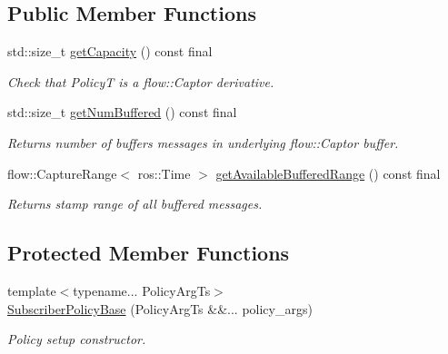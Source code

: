 \subsection*{Public Member Functions}
\begin{DoxyCompactItemize}
\item 
std\+::size\+\_\+t \hyperlink{classflow__ros_1_1_subscriber_policy_base_ad386c7963771122c13674afc5934c371}{get\+Capacity} () const final
\begin{DoxyCompactList}\small\item\em Check that PolicyT is a flow\+::\+Captor derivative. \end{DoxyCompactList}\item 
\mbox{\label{classflow__ros_1_1_subscriber_policy_base_a2c99605a1aef9b82087bc0f74b267ecc}} 
std\+::size\+\_\+t \hyperlink{classflow__ros_1_1_subscriber_policy_base_a2c99605a1aef9b82087bc0f74b267ecc}{get\+Num\+Buffered} () const final
\begin{DoxyCompactList}\small\item\em Returns number of buffers messages in underlying {\ttfamily flow\+::\+Captor} buffer. \end{DoxyCompactList}\item 
\mbox{\label{classflow__ros_1_1_subscriber_policy_base_a5e6741fd671b011356b1374d500cbd38}} 
flow\+::\+Capture\+Range$<$ ros\+::\+Time $>$ \hyperlink{classflow__ros_1_1_subscriber_policy_base_a5e6741fd671b011356b1374d500cbd38}{get\+Available\+Buffered\+Range} () const final
\begin{DoxyCompactList}\small\item\em Returns stamp range of all buffered messages. \end{DoxyCompactList}\end{DoxyCompactItemize}
\subsection*{Protected Member Functions}
\begin{DoxyCompactItemize}
\item 
\mbox{\label{classflow__ros_1_1_subscriber_policy_base_ad74822efa225007b31fb6ea4b34898d0}} 
{\footnotesize template$<$typename... Policy\+Arg\+Ts$>$ }\\\hyperlink{classflow__ros_1_1_subscriber_policy_base_ad74822efa225007b31fb6ea4b34898d0}{Subscriber\+Policy\+Base} (Policy\+Arg\+Ts \&\&... policy\+\_\+args)
\begin{DoxyCompactList}\small\item\em Policy setup constructor. \end{DoxyCompactList}\end{DoxyCompactItemize}
